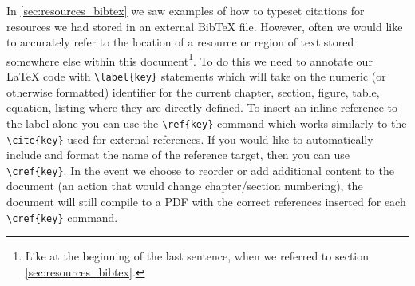 In \cref{sec:resources_bibtex} we saw examples of how to typeset citations for resources we had stored in an external Bib\TeX{} file.
However, often we would like to accurately refer to the location of a resource or region of text stored somewhere else within this document\footnote{Like at the beginning of the last sentence, when we referred to section \cref{sec:resources_bibtex}.}.
To do this we need to annotate our \LaTeX{} code with \lstinline|\label{key}| statements which will take on the numeric (or otherwise formatted) identifier for the current chapter, section, figure, table, equation, listing \etc where they are directly defined.
To insert an inline reference to the label alone you can use the \lstinline|\ref{key}| command which works similarly to the \lstinline|\cite{key}| used for external references.
If you would like to automatically include and format the name of the reference target, then you can use \lstinline|\cref{key}|.
In the event we choose to reorder or add additional content to the document (\ie an action that would change chapter/section numbering), the document will still compile to a PDF with the correct references inserted for each \lstinline|\cref{key}| command.


	
		
	
	
	
	
	
